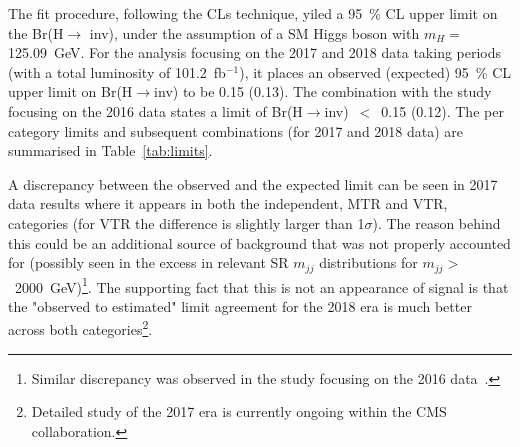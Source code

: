 \hspace{10pt} The fit procedure, following the CLs technique, yiled a 95~\% CL upper limit on the Br(H$\rightarrow$ inv), under the assumption of a SM Higgs boson with $m_{H} = $125.09~GeV. For the analysis focusing on the 2017 and 2018 data taking periods (with a total luminosity of 101.2~fb$^{-1}$), it places an observed (expected) 95~\% CL upper limit on Br(H$\rightarrow$inv) to be 0.15 (0.13). The combination with the study focusing on the 2016 data states a limit of Br(H$\rightarrow$inv)~$<$~0.15 (0.12). The per category limits and subsequent combinations (for 2017 and 2018 data) are summarised in Table~\ref{tab:limits}.

\hspace{10pt} A discrepancy between the observed and the expected limit can be seen in 2017 data results where it appears in both the independent, MTR and VTR, categories (for VTR the difference is slightly larger than 1$\sigma$). The reason behind this could be an additional source of background that was not properly accounted for (possibly seen in the excess in relevant SR $m_{jj}$ distributions for $m_{jj}>$~2000~GeV)\footnote{Similar discrepancy was observed in the study focusing on the 2016 data~\cite{paper:HIG_17_023}.}. The supporting fact that this is not an appearance of signal is that the "observed to estimated" limit agreement for the 2018 era is much better across both categories\footnote{Detailed study of the 2017 era is currently ongoing within the CMS collaboration.}.

